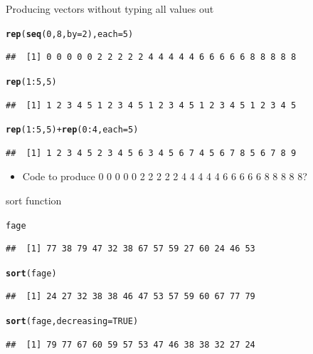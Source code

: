 \documentclass{beamer}\usepackage[]{graphicx}\usepackage[]{color}
\makeatletter
\newcommand{\hlnum}[1]{\textcolor[rgb]{0.686,0.059,0.569}{#1}}%
\newcommand{\hlopt}[1]{\textcolor[rgb]{0,0,0}{#1}}%
\newcommand{\hlstd}[1]{\textcolor[rgb]{0.345,0.345,0.345}{#1}}%
\newcommand{\hlkwc}[1]{\textcolor[rgb]{0.333,0.667,0.333}{#1}}%
\newcommand{\hlkwd}[1]{\textcolor[rgb]{0.737,0.353,0.396}{\textbf{#1}}}%
\newenvironment{kframe}{%
 \def\at@end@of@kframe{}%
 \ifinner\ifhmode%
  \def\at@end@of@kframe{\end{minipage}}%
  \begin{minipage}{\columnwidth}%
 \fi\fi%
 \def\FrameCommand##1{\hskip\@totalleftmargin \hskip-\fboxsep
 \colorbox{shadecolor}{##1}\hskip-\fboxsep
     \hskip-\linewidth \hskip-\@totalleftmargin \hskip\columnwidth}%
 \MakeFramed {\advance\hsize-\width
   \@totalleftmargin\z@ \linewidth\hsize
   \@setminipage}}%
 {\par\unskip\endMakeFramed%
 \at@end@of@kframe}
\newenvironment{knitrout}{}{} %
\renewenvironment{knitrout}{\begin{singlespace}}{\end{singlespace}}
\theoremstyle{mystyle}
\makeatother
\begin{document}
\begin{frame}[fragile]{Producing vectors without typing all values out}%
\begin{knitrout}
\color{fgcolor}\begin{kframe}
\begin{alltt}
\hlkwd{rep}\hlstd{(}\hlkwd{seq}\hlstd{(}\hlnum{0}\hlstd{,} \hlnum{8}\hlstd{,} \hlkwc{by} \hlstd{=} \hlnum{2}\hlstd{),} \hlkwc{each} \hlstd{=} \hlnum{5}\hlstd{)}
\end{alltt}
\begin{verbatim}
##  [1] 0 0 0 0 0 2 2 2 2 2 4 4 4 4 4 6 6 6 6 6 8 8 8 8 8
\end{verbatim}
\begin{alltt}
\hlkwd{rep}\hlstd{(}\hlnum{1}\hlopt{:}\hlnum{5}\hlstd{,} \hlnum{5}\hlstd{)}
\end{alltt}
\begin{verbatim}
##  [1] 1 2 3 4 5 1 2 3 4 5 1 2 3 4 5 1 2 3 4 5 1 2 3 4 5
\end{verbatim}
\begin{alltt}
\hlkwd{rep}\hlstd{(}\hlnum{1}\hlopt{:}\hlnum{5}\hlstd{,} \hlnum{5}\hlstd{)} \hlopt{+} \hlkwd{rep}\hlstd{(}\hlnum{0}\hlopt{:}\hlnum{4}\hlstd{,} \hlkwc{each} \hlstd{=} \hlnum{5}\hlstd{)}
\end{alltt}
\begin{verbatim}
##  [1] 1 2 3 4 5 2 3 4 5 6 3 4 5 6 7 4 5 6 7 8 5 6 7 8 9
\end{verbatim}
\end{kframe}
\end{knitrout}
\begin{itemize}
\item Code to produce 
0 0 0 0 0 2 2 2 2 2 4 4 4 4 4 6 6 6 6 6 8 8 8 8 8?
\end{itemize}
\end{frame}

\begin{frame}[fragile]{sort function}%
\begin{knitrout}
\color{fgcolor}\begin{kframe}
\begin{alltt}
\hlstd{fage}
\end{alltt}
\begin{verbatim}
##  [1] 77 38 79 47 32 38 67 57 59 27 60 24 46 53
\end{verbatim}
\begin{alltt}
\hlkwd{sort}\hlstd{(fage)}
\end{alltt}
\begin{verbatim}
##  [1] 24 27 32 38 38 46 47 53 57 59 60 67 77 79
\end{verbatim}
\begin{alltt}
\hlkwd{sort}\hlstd{(fage,} \hlkwc{decreasing} \hlstd{=} \hlnum{TRUE}\hlstd{)}
\end{alltt}
\begin{verbatim}
##  [1] 79 77 67 60 59 57 53 47 46 38 38 32 27 24
\end{verbatim}
\end{kframe}
\end{knitrout}
\end{frame}
\end{document}
